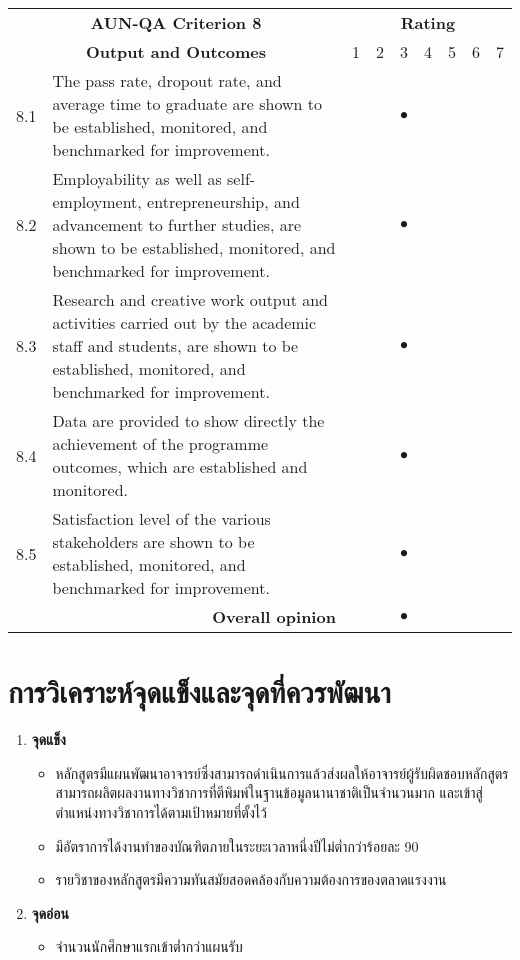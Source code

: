 \begin{longtable}{|c| p{}|p{0.3cm}|p{0.3cm}|c|p{0.3cm}|p{0.3cm}|p{0.3cm}|p{0.3cm}|}
	\hline
	\multicolumn{2}{|c|}{\bf AUN-QA Criterion 8}&\multicolumn{7}{c|}{\bf Rating}\\\cline{3-9}
	\multicolumn{2}{|c|}{\bf Output and Outcomes}&1&2&3&4&5&6&7\\\hline
	\endhead

8.1&The pass rate, dropout rate, and average time to graduate are shown to be established, monitored, and benchmarked for improvement.&&& {\huge{$\bullet$}}&&&&\\\hline

8.2&Employability as well as self-employment, entrepreneurship, and advancement to further studies, are shown to be established, monitored, and benchmarked for improvement.&&& {\huge{$\bullet$}}&&&&\\\hline

8.3&Research and creative work output and activities carried out by the academic staff and students, are shown to be established, monitored, and benchmarked for improvement.&&& {\huge{$\bullet$}}&&&&\\\hline

8.4&Data are provided to show directly the achievement of the programme outcomes, which are established and monitored.&&& {\huge{$\bullet$}}&&&&\\\hline

8.5&Satisfaction level of the various stakeholders are shown to be established, monitored, and benchmarked for improvement.&&& {\huge{$\bullet$}}&&&&\\\hline
	
\multicolumn{2}{|r|}{\bf Overall opinion}&&& {\huge{$\bullet$}}&&&&\\\hline
\end{longtable}

\section{การวิเคราะห์จุดแข็งและจุดที่ควรพัฒนา}
\begin{enumerate}
	\item[]\textbf{จุดแข็ง}
	\begin{itemize}[label=-]
		\item หลักสูตรมีแผนพัฒนาอาจารย์ซึ่งสามารถดำเนินการแล้วส่งผลให้อาจารย์ผู้รับผิดชอบหลักสูตรสามารถผลิตผลงานทางวิชาการที่ตีพิมพ์ในฐานข้อมูลนานาชาติเป็นจำนวนมาก และเข้าสู่ตำแหน่งทางวิชาการได้ตามเป้าหมายที่ตั้งไว้
		\item มีอัตราการได้งานทำของบัณฑิตภายในระยะเวลาหนึ่งปีไม่ต่ำกว่าร้อยละ 90
		\item รายวิชาของหลักสูตรมีความทันสมัยสอดคล้องกับความต้องการของตลาดแรงงาน
	\end{itemize}
\item[]\textbf{จุดอ่อน}
	\begin{itemize}[label=-]
	\item จำนวนนักศึกษาแรกเข้าต่ำกว่าแผนรับ
	\end{itemize}
\end{enumerate}
